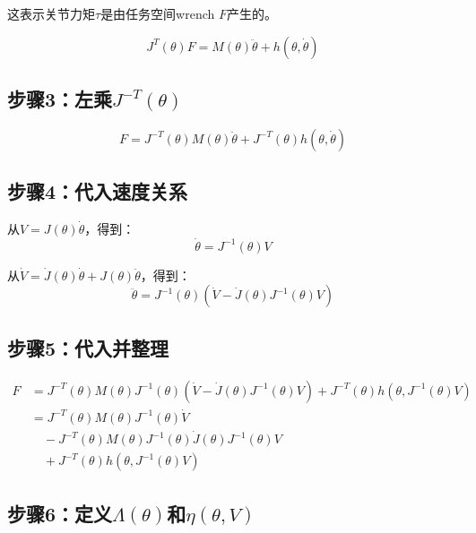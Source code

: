 \documentclass[12pt,a4paper]{article}
\begin{document}
这表示关节力矩$\tau$是由任务空间wrench $F$产生的。

\begin{equation}
J^T(\theta)F = M(\theta)\ddot{\theta} + h(\theta, \dot{\theta})
\end{equation}

\subsection{步骤3：左乘$J^{-T}(\theta)$}

\begin{equation}
F = J^{-T}(\theta)M(\theta)\ddot{\theta} + J^{-T}(\theta)h(\theta, \dot{\theta})
\end{equation}

\subsection{步骤4：代入速度关系}

从$V = J(\theta)\dot{\theta}$，得到：
\begin{equation}
\dot{\theta} = J^{-1}(\theta)V
\end{equation}

从$\dot{V} = \dot{J}(\theta)\dot{\theta} + J(\theta)\ddot{\theta}$，得到：
\begin{equation}
\ddot{\theta} = J^{-1}(\theta)(\dot{V} - \dot{J}(\theta)J^{-1}(\theta)V)
\end{equation}

\subsection{步骤5：代入并整理}

\begin{align}
F &= J^{-T}(\theta)M(\theta)J^{-1}(\theta)(\dot{V} - \dot{J}(\theta)J^{-1}(\theta)V) + J^{-T}(\theta)h(\theta, J^{-1}(\theta)V) \\
&= J^{-T}(\theta)M(\theta)J^{-1}(\theta)\dot{V} \\
&\quad - J^{-T}(\theta)M(\theta)J^{-1}(\theta)\dot{J}(\theta)J^{-1}(\theta)V \\
&\quad + J^{-T}(\theta)h(\theta, J^{-1}(\theta)V)
\end{align}

\subsection{步骤6：定义$\Lambda(\theta)$和$\eta(\theta, V)$}
\end{document}

